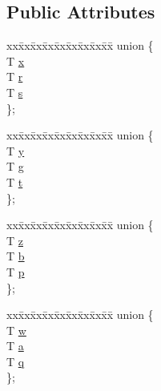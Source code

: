 \subsection*{Public Attributes}
\begin{DoxyCompactItemize}
\item 
\begin{tabbing}
xx\=xx\=xx\=xx\=xx\=xx\=xx\=xx\=xx\=\kill
union \{\\
\>T \hyperlink{structglm_1_1detail_1_1tvec4_a432497fdfcbcf5ccd75b822cdebafe6b}{x}\\
\>T \hyperlink{structglm_1_1detail_1_1tvec4_a0536facf6079019db542c0f1a47e569c}{r}\\
\>T \hyperlink{structglm_1_1detail_1_1tvec4_a82cbced4cbd070056c5acbc1d4d4906f}{s}\\
\}; \\

\end{tabbing}\item 
\begin{tabbing}
xx\=xx\=xx\=xx\=xx\=xx\=xx\=xx\=xx\=\kill
union \{\\
\>T \hyperlink{structglm_1_1detail_1_1tvec4_a693e41210b49a742eb6c1fd0eb8acb3a}{y}\\
\>T \hyperlink{structglm_1_1detail_1_1tvec4_a9efd411700d82e7454d65298e0381dc9}{g}\\
\>T \hyperlink{structglm_1_1detail_1_1tvec4_a7ef5d59e2d28f81eedf4a26b6023136d}{t}\\
\}; \\

\end{tabbing}\item 
\begin{tabbing}
xx\=xx\=xx\=xx\=xx\=xx\=xx\=xx\=xx\=\kill
union \{\\
\>T \hyperlink{structglm_1_1detail_1_1tvec4_a382ff89e1d0594bd8366d532b4e3c28a}{z}\\
\>T \hyperlink{structglm_1_1detail_1_1tvec4_afad14b1ed68cf8402c636513ec04ba33}{b}\\
\>T \hyperlink{structglm_1_1detail_1_1tvec4_a4feef51a7009aba3ff52f7a6bca31af6}{p}\\
\}; \\

\end{tabbing}\item 
\begin{tabbing}
xx\=xx\=xx\=xx\=xx\=xx\=xx\=xx\=xx\=\kill
union \{\\
\>T \hyperlink{structglm_1_1detail_1_1tvec4_a6b1f294d076a4a08420e7d8131a2f0ea}{w}\\
\>T \hyperlink{structglm_1_1detail_1_1tvec4_a0df75f03c55bcf27c344d34d8648f24e}{a}\\
\>T \hyperlink{structglm_1_1detail_1_1tvec4_a5e51b506546f82affa04f4c2ebafdbdc}{q}\\
\}; \\

\end{tabbing}\end{DoxyCompactItemize}


